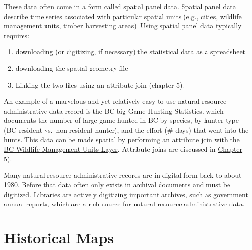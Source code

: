 \documentclass[
]{book}
\providecommand{\tightlist}{%
  \setlength{\itemsep}{0pt}\setlength{\parskip}{0pt}}
\begin{document}
These data often come in a form called spatial panel data. Spatial panel data describe time series associated with particular spatial units (e.g., cities, wildlife management units, timber harvesting areas). Using spatial panel data typically requires:

\begin{enumerate}
\def\labelenumi{\arabic{enumi}.}
\tightlist
\item
  downloading (or digitizing, if necessary) the statistical data as a spreadsheet
\item
  downloading the spatial geometry file
\item
  Linking the two files using an attribute join (chapter 5).
\end{enumerate}

An example of a marvelous and yet relatively easy to use natural resource administrative data record is the \href{https://catalogue.data.gov.bc.ca/dataset/big-game-harvest-statistics-1976-to-current}{BC big Game Hunting Statistics}, which documents the number of large game hunted in BC by species, by hunter type (BC resident vs.~non-resident hunter), and the effort (\# days) that went into the hunts. This data can be made spatial by performing an attribute join with the \href{https://catalogue.data.gov.bc.ca/dataset/wildlife-management-units}{BC Wildlife Management Units Layer}. Attribute joins are discussed in \href{https://ubc-geomatics-textbook.github.io/geomatics-textbook/relational-databases.html}{Chapter 5}).

Many natural resource administrative records are in digital form back to about 1980. Before that data often only exists in archival documents and must be digitized. Libraries are actively digitizing important archives, such as government annual reports, which are a rich source for natural resource administrative data.

\hypertarget{historical-maps}{%
\section{Historical Maps}\label{historical-maps}}
\end{document}
